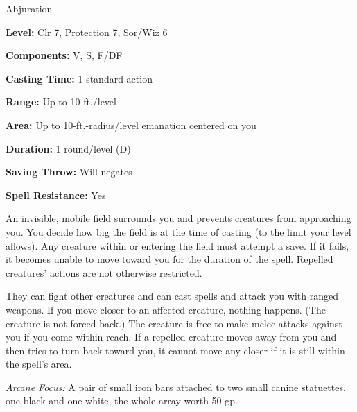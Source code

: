 
Abjuration

\textbf{Level:} Clr 7, Protection 7, Sor/Wiz 6

\textbf{Components:} V, S, F/DF

\textbf{Casting Time:} 1 standard action

\textbf{Range:} Up to 10 ft./level

\textbf{Area:} Up to 10-ft.-radius/level emanation centered on you

\textbf{Duration:} 1 round/level (D)

\textbf{Saving Throw:} Will negates

\textbf{Spell Resistance:} Yes

An invisible, mobile field surrounds you and prevents creatures from approaching 
you. You decide how big the field is at the time of casting (to the limit your 
level allows). Any creature within or entering the field must attempt a save. If 
it fails, it becomes unable to move toward you for the duration of the spell. Repelled 
creatures' actions are not otherwise restricted.

They can fight other creatures and can cast spells and attack you with ranged weapons. 
If you move closer to an affected creature, nothing happens. (The creature is not 
forced back.) The creature is free to make melee attacks against you if you come 
within reach. If a repelled creature moves away from you and then tries to turn 
back toward you, it cannot move any closer if it is still within the spell's area.

\textit{Arcane Focus:} A pair of small iron bars attached to two small canine statuettes, 
one black and one white, the whole array worth 50 gp.

